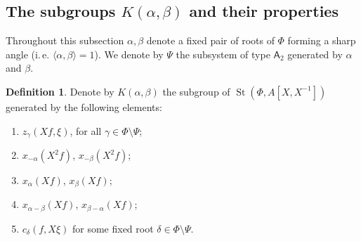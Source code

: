 \documentclass[oneside, 8pt]{amsart}
\theoremstyle{remark}
\theoremstyle{definition}
\newtheorem{df}[lemma]{Definition} \Crefname{df}{Definition}{Definitions}
\DeclareMathOperator{\St}{St}
\newcommand{\rA}{\mathsf{A}}
\numberwithin{equation}{section}
\begin{document}
\subsection{The subgroups \texorpdfstring{$K(\alpha, \beta)$}{K(a,b)} and their properties}
Throughout this subsection $\alpha, \beta$ denote a fixed pair of roots of $\Phi$ forming a sharp angle (i.\,e. $\langle \alpha, \beta \rangle = 1$). We denote by $\Psi$ the subsystem of type $\rA_2$ generated by $\alpha$ and $\beta$.
\begin{df} Denote by $K(\alpha, \beta)$ the subgroup of $\St(\Phi, A[X, X^{-1}])$ generated by the following elements:
 \begin{enumerate}
  \item $z_\gamma(Xf, \xi)$, for all $\gamma \in \Phi \setminus \Psi$;
  \item $x_{-\alpha}(X^2f)$, $x_{-\beta}(X^2f)$;
  \item $x_{\alpha}(Xf)$, $x_\beta(Xf)$;
  \item $x_{\alpha-\beta}(Xf)$, $x_{\beta-\alpha}(Xf)$;
  \item $c_{\delta}(f, X\xi)$ for some fixed root $\delta \in \Phi \setminus \Psi$. \end{enumerate} \end{df}
  
\end{document}
